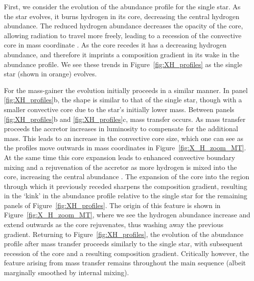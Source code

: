 \documentclass[twocolumn, twocolappendix, oneside]{aastex631}
\begin{document}
First, we consider the evolution of the abundance profile for the single star. As the star evolves, it burns hydrogen in its core, decreasing the central hydrogen abundance. The reduced hydrogen abundance decreases the opacity of the core, allowing radiation to travel more freely, leading to a recession of the convective core in mass coordinate \citep{Mitalas+1972,Crowe+1982,Miglio+2008,SilvaAguirre+2011, Xin+2022}. As the core recedes it has a decreasing hydrogen abundance, and therefore it imprints a composition gradient in its wake in the abundance profile. We see these trends in Figure~\ref{fig:XH_profiles} as the single star (shown in orange) evolves.

For the mass-gainer the evolution initially proceeds in a similar manner. In panel \ref{fig:XH_profiles}b, the shape is similar to that of the single star, though with a smaller convective core due to the star's initially lower mass. Between panels \ref{fig:XH_profiles}b and \ref{fig:XH_profiles}c, mass transfer occurs. As mass transfer proceeds the accretor increases in luminosity to compensate for the additional mass. This leads to an increase in the convective core size, which one can see as the profiles move outwards in mass coordinates in Figure~\ref{fig:X_H_zoom_MT}. At the same time this core expansion leads to enhanced convective boundary mixing and a rejuvenation of the accretor as more hydrogen is mixed into the core, increasing the central abundance \citep{Neo+1977}. The expansion of the core into the region through which it previously receded sharpens the composition gradient, resulting in the `kink' in the abundance profile relative to the single star for the remaining panels of Figure~\ref{fig:XH_profiles}. The origin of this feature is shown in Figure~\ref{fig:X_H_zoom_MT}, where we see the hydrogen abundance increase and extend outwards as the core rejuvenates, thus washing away the previous gradient. Returning to Figure~\ref{fig:XH_profiles}, the evolution of the abundance profile after mass transfer proceeds similarly to the single star, with subsequent recession of the core and a resulting composition gradient. Critically however, the feature arising from mass transfer remains throughout the main sequence (albeit marginally smoothed by internal mixing).
\end{document}
